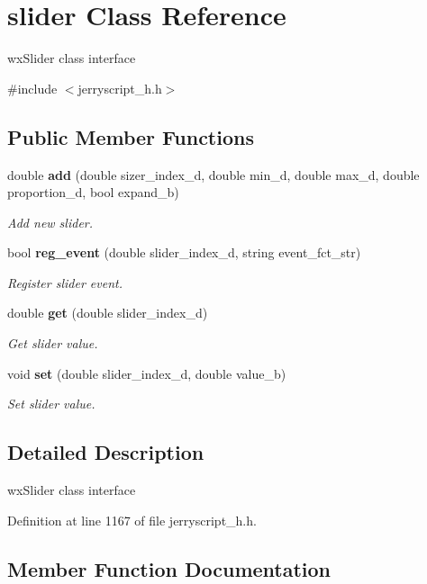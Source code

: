 \section{slider Class Reference}
\label{classslider}


wx\+Slider class interface  




{\ttfamily \#include $<$jerryscript\+\_\+h.\+h$>$}

\subsection*{Public Member Functions}
\begin{DoxyCompactItemize}
\item 
double \textbf{ add} (double sizer\+\_\+index\+\_\+d, double min\+\_\+d, double max\+\_\+d, double proportion\+\_\+d, bool expand\+\_\+b)
\begin{DoxyCompactList}\small\item\em Add new slider. \end{DoxyCompactList}\item 
bool \textbf{ reg\+\_\+event} (double slider\+\_\+index\+\_\+d, string event\+\_\+fct\+\_\+str)
\begin{DoxyCompactList}\small\item\em Register slider event. \end{DoxyCompactList}\item 
double \textbf{ get} (double slider\+\_\+index\+\_\+d)
\begin{DoxyCompactList}\small\item\em Get slider value. \end{DoxyCompactList}\item 
void \textbf{ set} (double slider\+\_\+index\+\_\+d, double value\+\_\+b)
\begin{DoxyCompactList}\small\item\em Set slider value. \end{DoxyCompactList}\end{DoxyCompactItemize}


\subsection{Detailed Description}
wx\+Slider class interface 

Definition at line 1167 of file jerryscript\+\_\+h.\+h.



\subsection{Member Function Documentation}
\mbox{\label{classslider_aebc02dc8ce3998d9dc68eadfb58e86e8}} 

